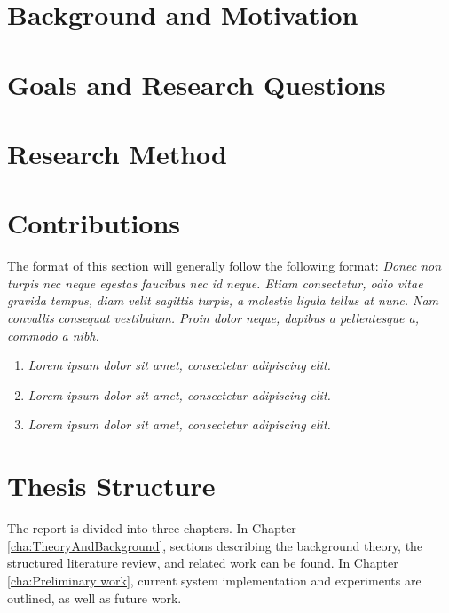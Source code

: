 \documentclass[a4paper]{book}
\begin{document}
\section{Background and Motivation}\label{cit}
\label{sec:BackgroundAndMotivation}



\section{Goals and Research Questions}
\label{sec:Goals and Research Questions}


\section{Research Method}
\label{sec:researchMethod}


\section{Contributions}
\label{sec:IntroContributions}

The format of this section will generally follow the following format:
{\it
Donec non turpis nec neque egestas faucibus nec id neque. Etiam consectetur, odio vitae gravida tempus, diam velit sagittis turpis, a molestie ligula tellus at nunc. Nam convallis consequat vestibulum. Proin dolor neque, dapibus a pellentesque a, commodo a nibh.}

\begin{enumerate}
\item {\it Lorem ipsum dolor sit amet, consectetur adipiscing elit.}
\item {\it Lorem ipsum dolor sit amet, consectetur adipiscing elit.}
\item {\it Lorem ipsum dolor sit amet, consectetur adipiscing elit.}
\end{enumerate}


\section{Thesis Structure}
\label{sec:thesisStructure}
The report is divided into three chapters. In Chapter \ref{cha:TheoryAndBackground}, sections describing the background theory, the structured literature review, and related work can be found. In Chapter \ref{cha:Preliminary work}, current system implementation and experiments are outlined, as well as future work.
\end{document}
